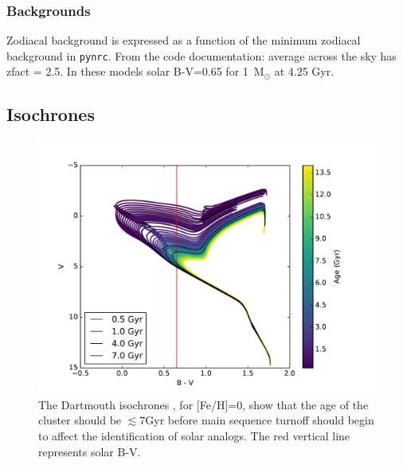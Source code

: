 \documentclass{aastex6}
\begin{document}
\subsubsection{Backgrounds}

Zodiacal background is expressed as a function of the minimum zodiacal background in \texttt{pynrc}.
From the code documentation: average across the sky has zfact = 2.5.
In these models solar B-V=0.65 for 1~M$_\odot$ at 4.25 Gyr.

\subsection{Isochrones}

\begin{figure}[!hbtp]
\centering
\includegraphics[width=.7\columnwidth]{hr_isochrones.pdf}
\caption{The Dartmouth isochrones \citep{dotter2008dartmouth}, for [Fe/H]=0, show that the age of the cluster should be $\lesssim 7 $Gyr before main sequence turnoff should begin to affect the identification of solar analogs.
The red vertical line represents solar B-V.}\label{fig:isochrones}
\end{figure}


\end{document}
